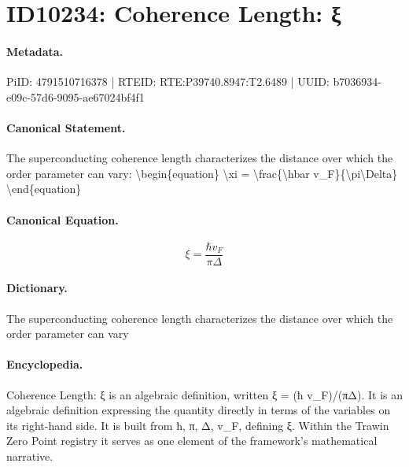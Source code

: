 \section*{ID10234: Coherence Length: ξ}
\paragraph{Metadata.}
PiID: 4791510716378 | RTEID: RTE:P39740.8947:T2.6489 | UUID: b7036934-e09c-57d6-9095-ae67024bf4f1

\paragraph{Canonical Statement.}
The superconducting coherence length characterizes the distance over which the order parameter can vary: \textbackslash{}begin\{equation\} \textbackslash{}xi = \textbackslash{}frac\{\textbackslash{}hbar v\_F\}\{\textbackslash{}pi\textbackslash{}Delta\} \textbackslash{}end\{equation\}

\paragraph{Canonical Equation.}
\[
\xi = \frac{\hbar v_F}{\pi\Delta}
\]

\paragraph{Dictionary.}
The superconducting coherence length characterizes the distance over which the order parameter can vary

\paragraph{Encyclopedia.}
Coherence Length: ξ is an algebraic definition, written ξ = (ħ v\_F)/(πΔ). It is an algebraic definition expressing the quantity directly in terms of the variables on its right-hand side. It is built from ħ, π, Δ, v\_F, defining ξ. Within the Trawin Zero Point registry it serves as one element of the framework's mathematical narrative.
